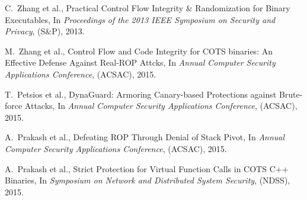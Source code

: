 \documentclass[11pt,a4paper,bibtotoc,idxtotoc,headsepline,footsepline,footexclude,BCOR20mm,DIV10]{scrbook}
\begin{document}
\begin{thebibliography}{50}
C.~Zhang et al., {Practical Control Flow Integrity \& Randomization for Binary Executables}, In
\emph{Proceedings of the 2013 IEEE Symposium on Security and Privacy}, (S\&P), 2013.

M.~Zhang et al., {Control Flow and Code Integrity for COTS binaries: An Effective Defense Against Real-ROP Attcks}, In
\emph{Annual Computer Security Applications Conference}, (ACSAC), 2015.

T.~Petsios et al., {DynaGuard: Armoring Canary-based Protections against Brute-force Attacks}, In
\emph{Annual Computer Security Applications Conference}, (ACSAC), 2015.

A.~Prakash et al., {Defeating ROP Through Denial of Stack Pivot}, In
\emph{Annual Computer Security Applications Conference}, (ACSAC), 2015.

A.~Prakash et al., {Strict Protection for Virtual Function Calls in COTS C++ Binaries}, In
\emph{Symposium on Network and Distributed System Security}, (NDSS), 2015.




\end{thebibliography}
	
 
\end{document}
